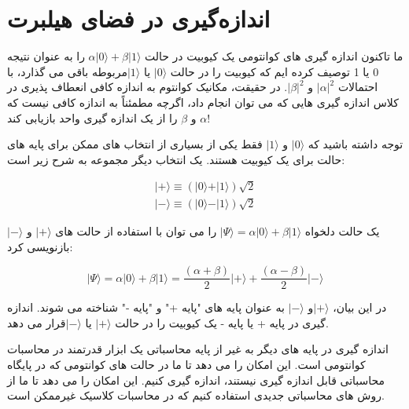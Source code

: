 \documentclass{book}
\begin{document}
\section{اندازه‌گیری در فضای هیلبرت}
ما تاکنون اندازه گیری های کوانتومی یک کیوبیت در حالت $\alpha\vert0\rangle + \beta\vert1\rangle$ را به عنوان نتیجه 0 یا 1 توصیف کرده ایم که کیوبیت را در حالت $\vert 0 \rangle$ یا $\vert 1 \rangle$مربوطه باقی می گذارد، با احتمالات $\vert\alpha\vert ^ 2$ و $\vert\beta\vert ^ 2$. در حقیقت، مکانیک کوانتوم به اندازه کافی انعطاف پذیری در کلاس اندازه گیری هایی که می توان انجام داد، اگرچه مطمئناً به اندازه کافی نیست که $\alpha$ و $\beta$ را از یک اندازه گیری واحد بازیابی کند!

توجه داشته باشید که $\vert 0 \rangle$ و $\vert 1 \rangle$ فقط یکی از بسیاری از انتخاب های ممکن برای پایه های حالت برای یک کیوبیت هستند. یک انتخاب دیگر مجموعه به شرح زیر است:

\begin{center}
\begin{equation}\label{ket +-} 
	\begin{split}
	\vert+\rangle  \equiv (\vert0\rangle + \vert1\rangle)\sqrt{2}\\
	\vert-\rangle \equiv  (\vert0\rangle - \vert1\rangle)\sqrt{2}
\end{split}
\end{equation}
\end{center}
 
 
 یک حالت دلخواه $\vert\Psi\rangle = \alpha\vert0\rangle + \beta\vert1\rangle$ را می توان با استفاده از حالت های $\vert + \rangle$ و $\vert - \rangle$ بازنویسی کرد:
\begin{center}
	\begin{equation}\label{basis to forier}
		\vert\Psi\rangle = \alpha \vert0\rangle + \beta\vert1\rangle = \frac{(\alpha + \beta)}{2}\vert+\rangle + \frac{(\alpha - \beta)}{2}\vert-\rangle
	\end{equation}
\end{center}


در این بیان، $\vert+\rangle$و $\vert-\rangle$ به عنوان پایه های "پایه +" و "پایه -" شناخته می شوند. اندازه گیری در پایه + یا پایه - یک کیوبیت را در حالت $\vert+\rangle$ یا $\vert-\rangle$قرار می دهد.
 

اندازه گیری در پایه های دیگر به غیر از پایه محاسباتی یک ابزار قدرتمند در محاسبات کوانتومی است. این امکان را می دهد تا ما در حالت های کوانتومی که در پایگاه محاسباتی قابل اندازه گیری نیستند، اندازه گیری کنیم. این امکان را می دهد تا ما از روش های محاسباتی جدیدی استفاده کنیم که در محاسبات کلاسیک غیرممکن است.
\end{document}
